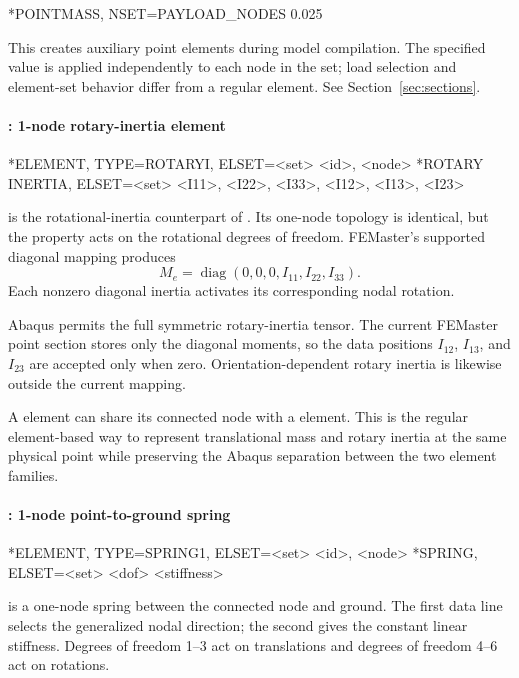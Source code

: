 \begin{inputdeck}
*POINTMASS, NSET=PAYLOAD_NODES
0.025
\end{inputdeck}

This creates auxiliary point elements during model compilation.
The specified value is applied independently to each node in the
set; load selection and element-set behavior differ from a regular
 element. See Section~\ref{sec:sections}.

\clearpage
\paragraph{: 1-node rotary-inertia element}

\begin{syntax}
*ELEMENT, TYPE=ROTARYI, ELSET=<set>
<id>, <node>
*ROTARY INERTIA, ELSET=<set>
<I11>, <I22>, <I33>, <I12>, <I13>, <I23>
\end{syntax}

 is the rotational-inertia counterpart of . Its one-node topology is identical, but the property acts on the rotational degrees of freedom. FEMaster's supported diagonal mapping produces
\[
M_e=\operatorname{diag}(0,0,0,I_{11},I_{22},I_{33}).
\]
Each nonzero diagonal inertia activates its corresponding nodal rotation.

Abaqus permits the full symmetric rotary-inertia tensor. The current FEMaster point section stores only the diagonal moments, so the data positions \(I_{12}\), \(I_{13}\), and \(I_{23}\) are accepted only when zero. Orientation-dependent rotary inertia is likewise outside the current mapping.

A  element can share its connected node with a  element. This is the regular element-based way to represent translational mass and rotary inertia at the same physical point while preserving the Abaqus separation between the two element families.

\clearpage
\paragraph{: 1-node point-to-ground spring}

\begin{syntax}
*ELEMENT, TYPE=SPRING1, ELSET=<set>
<id>, <node>
*SPRING, ELSET=<set>
<dof>
<stiffness>
\end{syntax}

 is a one-node spring between the connected node and ground. The first  data line selects the generalized nodal direction; the second gives the constant linear stiffness. Degrees of freedom 1--3 act on translations and degrees of freedom 4--6 act on rotations.

